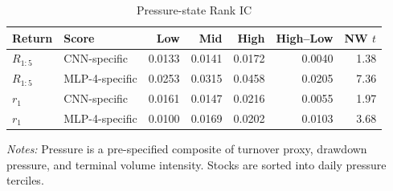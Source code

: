 \begin{table}[htbp]
\centering
\caption{Pressure-state Rank IC}
\label{tab:mechanism_pressure}
\begin{tabular}{llrrrrr}
\toprule
Return & Score & Low & Mid & High & High--Low & NW $t$ \\
\midrule
$R_{1:5}$ & CNN-specific & 0.0133 & 0.0141 & 0.0172 & 0.0040 & 1.38 \\
$R_{1:5}$ & MLP-4-specific & 0.0253 & 0.0315 & 0.0458 & 0.0205 & 7.36 \\
$r_1$ & CNN-specific & 0.0161 & 0.0147 & 0.0216 & 0.0055 & 1.97 \\
$r_1$ & MLP-4-specific & 0.0100 & 0.0169 & 0.0202 & 0.0103 & 3.68 \\
\bottomrule
\end{tabular}
\begin{minipage}{0.92\linewidth}
\footnotesize
\textit{Notes:} Pressure is a pre-specified composite of turnover proxy, drawdown pressure, and terminal volume intensity. Stocks are sorted into daily pressure terciles.
\end{minipage}
\end{table}

